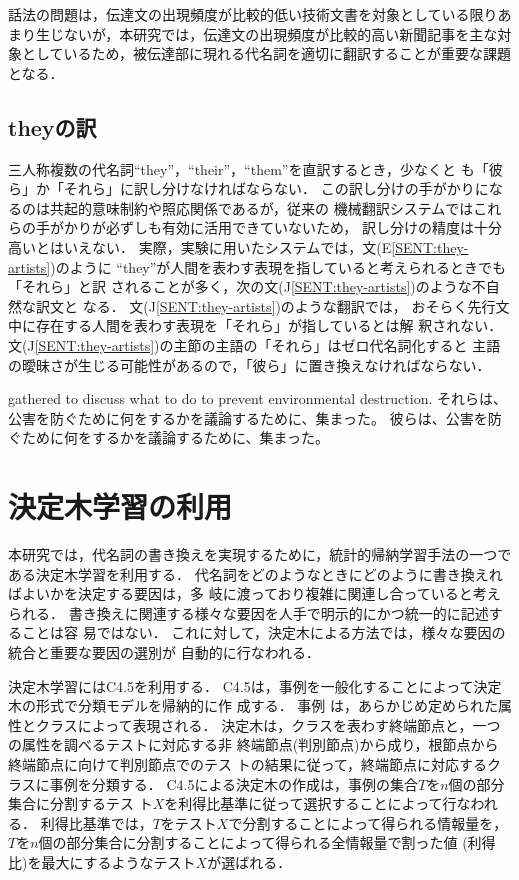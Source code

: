 話法の問題は，伝達文の出現頻度が比較的低い技術文書を対象としている限りあ
まり生じないが，本研究では，伝達文の出現頻度が比較的高い新聞記事を主な対
象としているため，被伝達部に現れる代名詞を適切に翻訳することが重要な課題
となる．

\subsection{theyの訳}
\label{sec:problem:they}

三人称複数の代名詞``they''，``their''，``them''を直訳するとき，少なくと
も「彼ら」か「それら」に訳し分けなければならない．
この訳し分けの手がかりになるのは共起的意味制約や照応関係であるが，従来の
機械翻訳システムではこれらの手がかりが必ずしも有効に活用できていないため，
訳し分けの精度は十分高いとはいえない．
実際，実験に用いたシステムでは，文(E\ref{SENT:they-artists})のように
``they''が人間を表わす表現を指していると考えられるときでも「それら」と訳
されることが多く，次の文(J\ref{SENT:they-artists})のような不自然な訳文と
なる．
文(J\ref{SENT:they-artists})のような翻訳では，
おそらく先行文中に存在する人間を表わす表現を「それら」が指しているとは解
釈されない．
文(J\ref{SENT:they-artists})の主節の主語の「それら」はゼロ代名詞化すると
主語の曖昧さが生じる可能性があるので，「彼ら」に置き換えなければならない．
\begin{SENT2}
 gathered to discuss what to do to prevent 
environmental destruction.
\sentJ それらは、公害を防ぐために何をするかを議論するために、集まった。
\NewsentJ 彼らは、公害を防ぐために何をするかを議論するために、集まった。
\label{SENT:they-artists}
\end{SENT2}

\section{決定木学習の利用}
\label{sec:decision_tree}

本研究では，代名詞の書き換えを実現するために，統計的帰納学習手法の一つで
ある決定木学習を利用する．
代名詞をどのようなときにどのように書き換えればよいかを決定する要因は，多
岐に渡っており複雑に関連し合っていると考えられる．
書き換えに関連する様々な要因を人手で明示的にかつ統一的に記述することは容
易ではない．
これに対して，決定木による方法では，様々な要因の統合と重要な要因の選別が
自動的に行なわれる．

決定木学習にはC4.5\cite{Quinlan92}を利用する．
C4.5は，事例を一般化することによって決定木の形式で分類モデルを帰納的に作
成する．
事例
は，あらかじめ定められた属性とクラスによって表現される．
決定木は，クラスを表わす終端節点と，一つの属性を調べるテストに対応する非
終端節点(判別節点)から成り，根節点から終端節点に向けて判別節点でのテス
トの結果に従って，終端節点に対応するクラスに事例を分類する．
C4.5による決定木の作成は，事例の集合$T$を$n$個の部分集合に分割するテス
ト$X$を利得比基準に従って選択することによって行なわれる．
利得比基準では，$T$をテスト$X$で分割することによって得られる情報量を，
$T$を$n$個の部分集合に分割することによって得られる全情報量で割った値
(利得比)を最大にするようなテスト$X$が選ばれる．

